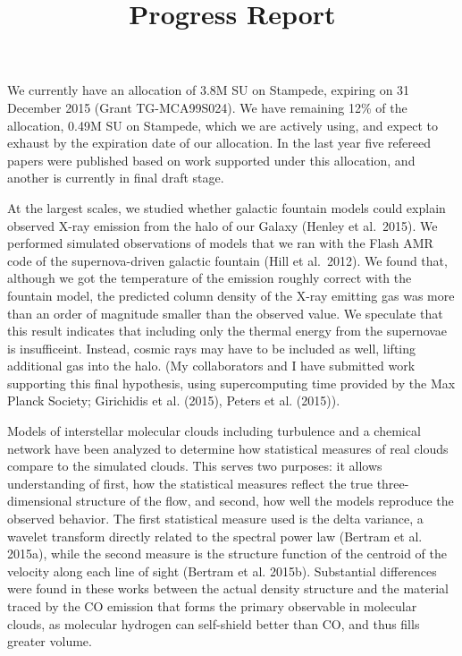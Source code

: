 \documentclass[12pt,preprint]{aastex}
\title{Progress Report}
\begin{document}
\maketitle
We currently have an allocation of 3.8M SU on Stampede, expiring on 31 December 2015 (Grant TG-MCA99S024).  We have remaining 12\% of the allocation, 0.49M SU on Stampede, which we are actively using, and expect to exhaust by the expiration date of our allocation.  In the last year five refereed papers were published based on work supported under this allocation, and another is currently in final draft stage.

At the largest scales, we studied whether galactic fountain models could explain observed X-ray emission from the halo of our Galaxy (Henley et al.\ 2015).  We performed simulated observations of models that we ran with the Flash AMR code of the supernova-driven galactic fountain (Hill et al.\ 2012).  We found that, although we got the temperature of the emission roughly correct with the fountain model, the predicted column density of the X-ray emitting gas was more than an order of magnitude smaller than the observed value.  We speculate that this result indicates that including only the thermal energy from the supernovae is insufficeint.  Instead, cosmic rays may have to be included as well, lifting additional gas into the halo. (My collaborators and I have submitted work supporting this final hypothesis, using supercomputing time provided by the Max Planck Society; Girichidis et al. (2015), Peters et al. (2015)).
 
Models of interstellar molecular clouds including turbulence and a chemical network have been analyzed to determine how statistical measures of real clouds compare to the simulated clouds.  This serves two purposes: it allows understanding of first, how the statistical measures reflect the true three-dimensional structure of the flow, and second, how well the models reproduce the observed behavior.  The first statistical measure used is the delta variance, a wavelet transform directly related to the spectral power law (Bertram et al. 2015a), while the second measure is the structure function of the centroid of the velocity along each line of sight (Bertram et al. 2015b).  Substantial differences were found in these works between the actual density structure and the material traced by the CO emission that forms the primary observable in molecular clouds, as molecular hydrogen can self-shield better than CO, and thus fills greater volume.
\end{document}
